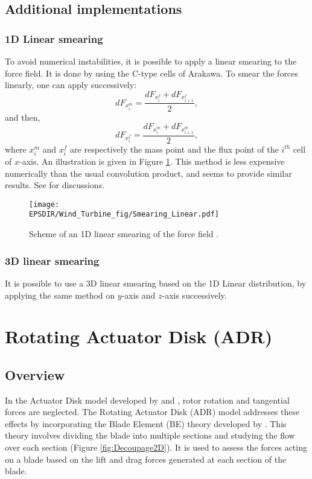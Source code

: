 \subsection{Additional implementations}
\subsubsection*{1D Linear smearing}
\label{sss:1dsmearADNR}
To avoid numerical instabilities, it is possible to apply a linear smearing to the force field. It is done by using the C-type cells of Arakawa. To smear the forces linearly, one can apply successively:
\begin{equation}
dF_{x_{i}^m} = \dfrac{dF_{x_{i}^f} + dF_{x_{i+1}^f}}{2},
\end{equation}
and then,
\begin{equation}
dF_{x_{i}^f} = \dfrac{dF_{x_{i}^m} + dF_{x_{i+1}^m}}{2},
\end{equation}
where $x_i^m$ and $x_i^f$ are respectively  the mass point and the flux point of the $i^{th}$ cell of $x$-axis. An illustration is given in Figure \ref{fig:smearinglin}. This method is less expensive numerically than the usual convolution product, and seems to provide similar results. See \citet{joulin2019modelisation} for discussions.

\begin{figure}[h]
\centering
\texttt{[image: \\EPSDIR/Wind\_Turbine\_fig/Smearing\_Linear.pdf]}
\caption{Scheme of an 1D linear smearing of the force field \citet{joulin2019modelisation}.}
\label{fig:smearinglin}  
\end{figure}

\subsubsection*{3D linear smearing}
\label{sss:3dsmearADNR}
It is possible to use a 3D linear smearing based on the 1D Linear distribution, by applying the same method on $y$-axis and $z$-axis successively.


\section{Rotating Actuator Disk (ADR)}

\subsection{Overview}
In the Actuator Disk model developed by \citet{rankine1865mechanical} and \citet{froude1889part}, rotor rotation and tangential forces are neglected. The Rotating Actuator Disk (ADR) model addresses these effects by incorporating the Blade Element (BE) theory developed by \citet{glauert1935airplane}. This theory involves dividing the blade into multiple sections and studying the flow over each section (Figure \ref{fig:Decoupage2D}). It is used to assess the forces acting on a blade based on the lift and drag forces generated at each section of the blade.

